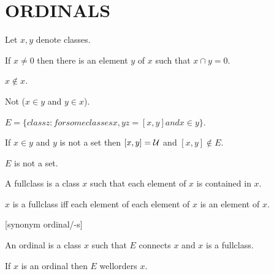 \documentclass[a4paper,draft]{amsproc}
\begin{document}
\section{ORDINALS}
\begin{forthel}

Let $x, y$ denote classes.
\begin{axiom}
If $x \neq 0$ then there is an element $y$ of $x$ such that $x \cap y = 0$.
\end{axiom}

\begin{theorem}[101]
$x \notin x$.
\end{theorem}

\begin{theorem}[102]
Not ($x \in y$ and $y \in x$).
\end{theorem}

\begin{definition}[103]
$E = \{class z : for some classes x,y z = [x,y] and x \in y\}$.
\end{definition}

\begin{lemma}
If $x \in y$ and $y$ is not a set then $[x,y] = \cal{U}$ and $[x,y] \notin E$.
\end{lemma}

\begin{theorem}[104]
$E$ is not a set.
\end{theorem}

\begin{definition}[105]
A fullclass is a class $x$ such that each element of $x$ is contained in $x$.
\end{definition}

\begin{lemma}
$x$ is a fullclass iff each element of each element of $x$ is an element of $x$.
\end{lemma}

[synonym ordinal/-s]
\begin{definition}[106]
An ordinal is a class $x$ such that $E$ connects $x$ and $x$ is a fullclass.
\end{definition}

\begin{theorem}[107]
If $x$ is an ordinal then $E$ wellorders $x$.
\end{theorem}


\end{forthel}
\end{document}
